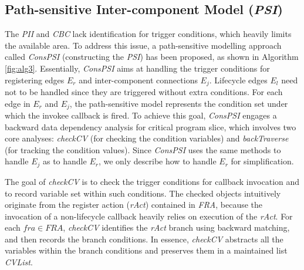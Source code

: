 
\subsection{Path-sensitive Inter-component Model (\textit{PSI})} 
The \textit{PII} and \textit{CBC} lack identification for trigger conditions, which heavily limits the available area. To address this issue, a path-sensitive modelling approach called \textit{ConsPSI} (constructing the \textit{PSI}) has been proposed, as shown in Algorithm \ref{fig:alg3}. Essentially, \textit{ConsPSI} aims at handling the trigger conditions for registering edges $E_{r}$ and inter-component connections $E_{j}$. Lifecycle edges $E_{l}$ need not to be handled since they are triggered without extra conditions. For each edge in $E_{r}$ and $E_{j}$, the path-sensitive model represents the condition set under which the invokee callback is fired. To achieve this goal, \textit{ConsPSI} engages a backward data dependency analysis for critical program slice, which involves two core analyses: \textit{checkCV} (for checking the condition variables) and \textit{backTraverse} (for tracking the condition values). Since \textit{ConsPSI} uses the same methods to handle $E_{j}$ as to handle $E_{r}$, we only describe how to handle $E_{r}$ for simplification.

The goal of \textit{checkCV} is to check the trigger conditions for callback invocation and to record variable set within such conditions. The checked objects intuitively originate from the register action (\textit{rAct}) contained in \textit{FRA}, because the invocation of a non-lifecycle callback heavily relies on execution of the \textit{rAct}. For each $fra\in FRA$, \textit{checkCV} identifies the \textit{rAct} branch using backward matching, and then records the branch conditions. In essence, \textit{checkCV} abstracts all the variables within the branch conditions and preserves them in a maintained list \textit{CVList}.

